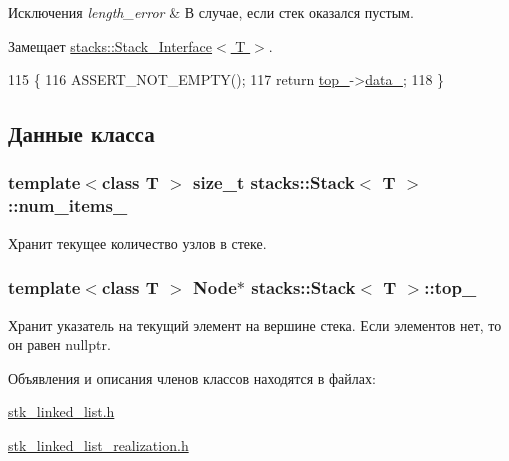 \begin{DoxyExceptions}{Исключения}
{\em length\+\_\+error} & В случае, если стек оказался пустым. \\
\hline
\end{DoxyExceptions}


Замещает \hyperlink{classstacks_1_1_stack___interface_a367aa4742f24927015a2b9a396faee56}{stacks\+::\+Stack\+\_\+\+Interface$<$ T $>$}.


\begin{DoxyCode}
115                     \{
116         ASSERT\_NOT\_EMPTY();
117         \textcolor{keywordflow}{return} \hyperlink{classstacks_1_1_stack_a68cd067db6b89353ec1f803eecd4cb74}{top\_}->\hyperlink{structstacks_1_1_stack_1_1_node_afbadaa4f786b45d6cd157070caf8ab83}{data\_};
118     \}
\end{DoxyCode}


\subsection{Данные класса}
\hypertarget{classstacks_1_1_stack_a43923df95ebc551432e9d3e955c32959}{}
\subsubsection[{num\+\_\+items\+\_\+}]{\setlength{\rightskip}{0pt plus 5cm}template$<$class T $>$ size\+\_\+t {\bf stacks\+::\+Stack}$<$ T $>$\+::num\+\_\+items\+\_\+\hspace{0.3cm}{\ttfamily [private]}}\label{classstacks_1_1_stack_a43923df95ebc551432e9d3e955c32959}


Хранит текущее количество узлов в стеке. 

\hypertarget{classstacks_1_1_stack_a68cd067db6b89353ec1f803eecd4cb74}{}
\subsubsection[{top\+\_\+}]{\setlength{\rightskip}{0pt plus 5cm}template$<$class T $>$ {\bf Node}$\ast$ {\bf stacks\+::\+Stack}$<$ T $>$\+::top\+\_\+\hspace{0.3cm}{\ttfamily [private]}}\label{classstacks_1_1_stack_a68cd067db6b89353ec1f803eecd4cb74}


Хранит указатель на текущий элемент на вершине стека. Если элементов нет, то он равен nullptr. 



Объявления и описания членов классов находятся в файлах\+:\begin{DoxyCompactItemize}
\item 
\hyperlink{stk__linked__list_8h}{stk\+\_\+linked\+\_\+list.\+h}\item 
\hyperlink{stk__linked__list__realization_8h}{stk\+\_\+linked\+\_\+list\+\_\+realization.\+h}\end{DoxyCompactItemize}

